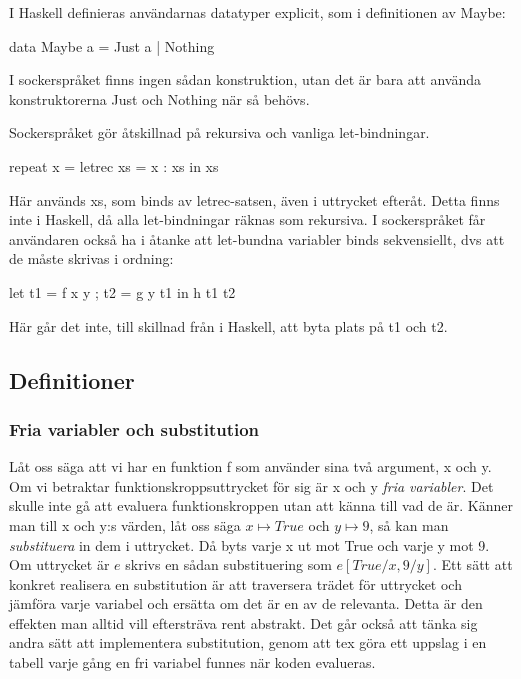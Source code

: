 \documentclass[Rapport]{subfiles}
\begin{document}
    I Haskell definieras användarnas datatyper explicit, som i definitionen
av Maybe:
\begin{codeEx}
data Maybe a = Just a | Nothing
\end{codeEx}
I sockerspråket finns ingen sådan konstruktion, utan det är bara att använda
konstruktorerna Just och Nothing när så behövs.


Sockerspråket gör åtskillnad på rekursiva och vanliga let-bindningar. 
\begin{codeEx}
repeat x = letrec xs = x : xs in xs  
\end{codeEx}
Här används xs, som binds av letrec-satsen, även i uttrycket efteråt. Detta
finns inte i Haskell, då alla let-bindningar räknas som rekursiva. I
sockerspråket får användaren också ha i åtanke att let-bundna variabler binds
sekvensiellt, dvs att de måste skrivas i ordning:
\begin{codeEx}
let { t1 = f x y
    ; t2 = g y t1
    }
in  h t1 t2
\end{codeEx}
Här går det inte, till skillnad från i Haskell, att byta plats på t1 och t2.


\subsection{Definitioner}

\subsubsection{Fria variabler och substitution}
Låt oss säga att vi har en funktion f som använder sina två 
argument, x och y. Om vi betraktar funktionskroppsuttrycket för sig är x och y 
\emph{fria variabler}. Det skulle inte gå att evaluera funktionskroppen utan
att känna till vad de är. Känner man till x och y:s värden, låt oss säga
$x \mapsto True$ och $y \mapsto 9$, så kan man \emph{substituera} in dem i uttrycket. Då byts varje
x ut mot True och varje y mot 9. Om uttrycket är $e$ skrivs en sådan substituering som $e[True/x, 9/y]$. 
    Ett sätt att konkret realisera en substitution är att traversera trädet
för uttrycket och jämföra varje variabel och ersätta om det är en av de
relevanta. Detta är den effekten man alltid vill eftersträva rent abstrakt.
Det går också att tänka sig andra sätt att implementera substitution, genom
att tex göra ett uppslag i en tabell varje gång en fri variabel funnes när
koden evalueras. 
\end{document}
